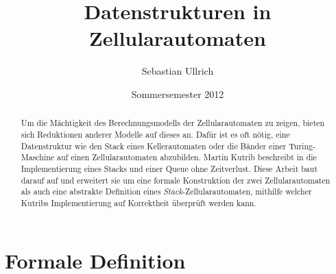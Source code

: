 \documentclass{article}
\title{Datenstrukturen in Zellularautomaten}
\author{Sebastian Ullrich}
\date{Sommersemester 2012}
\begin{document}
\newcommand{\ca}{\ensuremath\mathcal{A}}
\newcommand{\abs}[1]{\lvert#1\rvert}
\newcommand{\ceil}[1]{\lceil#1\rceil}
\newcommand{\zrange}[1]{\{1,\dots,#1\}}
\newcommand{\bild}[1]{\text{Bild}(#1)}
\newcommand{\N}{\mathbb{N}}
\newcommand{\ve}[3]{\begin{pmatrix}#1\\#2\\#3\end{pmatrix}}
\newcommand{\vet}[2]{\begin{pmatrix}#1\\#2\end{pmatrix}}

\newcommand{\pop}{\ensuremath{\mathit{pop}}\xspace}
\newcommand{\popZiel}{\ensuremath{\mathit{popZiel}}\xspace}
\newcommand{\popQuelle}{\ensuremath{\mathit{popQuelle}}\xspace}
\newcommand{\nop}{\ensuremath{\mathit{nop}}\xspace}
\newcommand{\push}{\ensuremath{\mathit{push}}\xspace}
\newcommand{\pushZiel}{\ensuremath{\mathit{pushZiel}}\xspace}
\newcommand{\pushQuelle}{\ensuremath{\mathit{pushQuelle}}\xspace}
\newcommand{\enqueue}{\ensuremath{\mathit{enqueue}}\xspace}
\newcommand{\dequeue}{\ensuremath{\mathit{dequeue}}\xspace}
\newcommand{\shiftUp}{\ensuremath{\mathit{shiftUp}}\xspace}
\newcommand{\demogrid}[1]{
    \begin{scope}
        \clip (-0.1,-0.1) rectangle (3.5,#1+0.1);
        \draw (1) (0,0) grid (4,#1);
    \end{scope}
}

\maketitle
\newpage
\mbox{}
\newpage

\begin{abstract}
	Um die Mächtigkeit des Berechnungsmodells der Zellularautomaten zu zeigen, bieten sich Reduktionen anderer Modelle auf dieses an. Dafür ist es oft nötig, eine Datenstruktur wie den Stack eines Kellerautomaten oder die Bänder einer Turing-Maschine auf einen Zellularautomaten abzubilden. Martin Kutrib beschreibt in \cite{kutrib08} die Implementierung eines Stacks und einer Queue ohne Zeitverlust. Diese Arbeit baut darauf auf und erweitert sie um eine formale Konstruktion der zwei Zellularautomaten als auch eine abstrakte Definition eines \emph{Stack}-Zellularautomaten, mithilfe welcher Kutribs Implementierung auf Korrektheit überprüft werden kann.
\end{abstract}

\section{Formale Definition}
\end{document}
